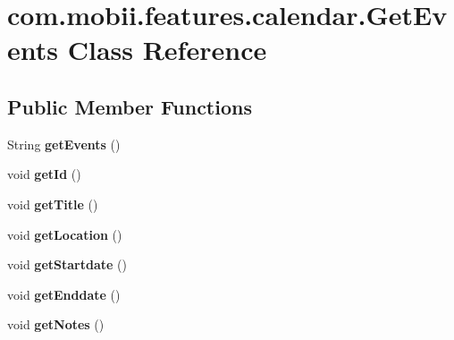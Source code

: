 \hypertarget{classcom_1_1mobii_1_1features_1_1calendar_1_1_get_events}{\section{com.\-mobii.\-features.\-calendar.\-Get\-Events Class Reference}
\label{classcom_1_1mobii_1_1features_1_1calendar_1_1_get_events}
}
\subsection*{Public Member Functions}
\begin{DoxyCompactItemize}
\item 
\hypertarget{classcom_1_1mobii_1_1features_1_1calendar_1_1_get_events_aa99c7b10fbe3fce7f6c5aa5e4e9f4ddd}{String {\bfseries get\-Events} ()}\label{classcom_1_1mobii_1_1features_1_1calendar_1_1_get_events_aa99c7b10fbe3fce7f6c5aa5e4e9f4ddd}

\item 
\hypertarget{classcom_1_1mobii_1_1features_1_1calendar_1_1_get_events_ab3c80ca5c878eab3e7f41d9de100c79e}{void {\bfseries get\-Id} ()}\label{classcom_1_1mobii_1_1features_1_1calendar_1_1_get_events_ab3c80ca5c878eab3e7f41d9de100c79e}

\item 
\hypertarget{classcom_1_1mobii_1_1features_1_1calendar_1_1_get_events_ad4db647b477f39ebc5c56f0f55459be5}{void {\bfseries get\-Title} ()}\label{classcom_1_1mobii_1_1features_1_1calendar_1_1_get_events_ad4db647b477f39ebc5c56f0f55459be5}

\item 
\hypertarget{classcom_1_1mobii_1_1features_1_1calendar_1_1_get_events_a4160133b39b4f2a75feeac82d5e52cf4}{void {\bfseries get\-Location} ()}\label{classcom_1_1mobii_1_1features_1_1calendar_1_1_get_events_a4160133b39b4f2a75feeac82d5e52cf4}

\item 
\hypertarget{classcom_1_1mobii_1_1features_1_1calendar_1_1_get_events_a1cc922dde96eeee121dd6ba0c29b56c7}{void {\bfseries get\-Startdate} ()}\label{classcom_1_1mobii_1_1features_1_1calendar_1_1_get_events_a1cc922dde96eeee121dd6ba0c29b56c7}

\item 
\hypertarget{classcom_1_1mobii_1_1features_1_1calendar_1_1_get_events_af8a76428e37ca7d47baa49708156fc9c}{void {\bfseries get\-Enddate} ()}\label{classcom_1_1mobii_1_1features_1_1calendar_1_1_get_events_af8a76428e37ca7d47baa49708156fc9c}

\item 
\hypertarget{classcom_1_1mobii_1_1features_1_1calendar_1_1_get_events_aab14b274a9ea013c331475198d42b6d5}{void {\bfseries get\-Notes} ()}\label{classcom_1_1mobii_1_1features_1_1calendar_1_1_get_events_aab14b274a9ea013c331475198d42b6d5}

\end{DoxyCompactItemize}
